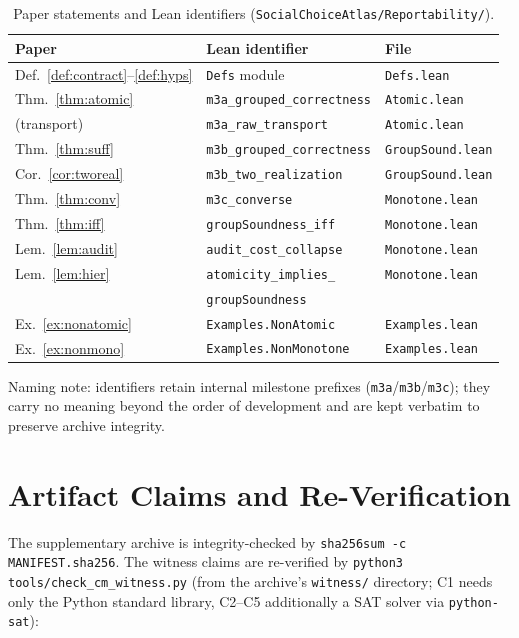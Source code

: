 \documentclass[sigplan,10pt,review,anonymous]{acmart}
\theoremstyle{acmdefinition}
\newcommand{\code}[1]{\texttt{#1}}
\begin{document}
\begin{table}[h]
\caption{Paper statements and Lean identifiers
(\code{SocialChoiceAtlas/Reportability/}).}
\label{tab:lean}
\small
\begin{tabular}{@{}lll@{}}
\toprule
Paper & Lean identifier & File \\
\midrule
Def.~\ref{def:contract}--\ref{def:hyps} & \code{Defs} module & \code{Defs.lean} \\
Thm.~\ref{thm:atomic} & \code{m3a\_grouped\_correctness} & \code{Atomic.lean} \\
\quad(transport) & \code{m3a\_raw\_transport} & \code{Atomic.lean} \\
Thm.~\ref{thm:suff} & \code{m3b\_grouped\_correctness} & \code{GroupSound.lean} \\
Cor.~\ref{cor:tworeal} & \code{m3b\_two\_realization} & \code{GroupSound.lean} \\
Thm.~\ref{thm:conv} & \code{m3c\_converse} & \code{Monotone.lean} \\
Thm.~\ref{thm:iff} & \code{groupSoundness\_iff} & \code{Monotone.lean} \\
Lem.~\ref{lem:audit} & \code{audit\_cost\_collapse} & \code{Monotone.lean} \\
Lem.~\ref{lem:hier} & \code{atomicity\_implies\_}& \code{Monotone.lean} \\
 & \quad\code{groupSoundness} & \\
Ex.~\ref{ex:nonatomic} & \code{Examples.NonAtomic} & \code{Examples.lean} \\
Ex.~\ref{ex:nonmono} & \code{Examples.NonMonotone} & \code{Examples.lean} \\
\bottomrule
\end{tabular}
\end{table}

Naming note: identifiers retain internal milestone prefixes
(\code{m3a}/\code{m3b}/\code{m3c}); they carry no meaning beyond the order of
development and are kept verbatim to preserve archive integrity.

\section{Artifact Claims and Re-Verification}
\label{app:artifact}

The supplementary archive is integrity-checked by
\code{sha256sum -c MANIFEST.sha256}. The witness claims are re-verified by
\code{python3 tools/check\_cm\_witness.py} (from the archive's
\code{witness/} directory; C1 needs only the Python standard library, C2--C5
additionally a SAT solver via \code{python-sat}):
\end{document}
